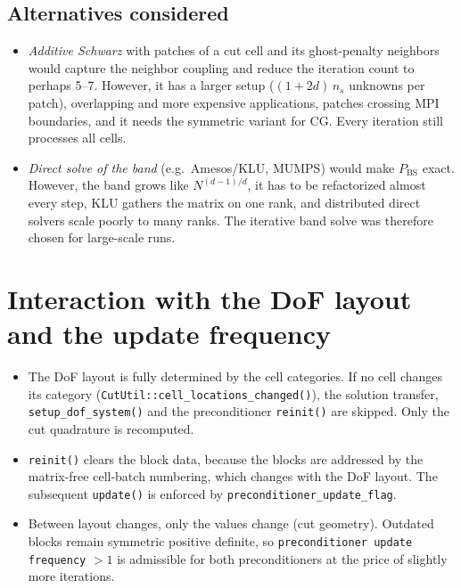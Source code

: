 \documentclass[11pt,a4paper]{article}
\newcommand{\PBS}{P_{\mathrm{BS}}}
\newcommand{\code}[1]{\nolinkurl{#1}}
\newcommand{\param}[1]{\texttt{#1}}
\begin{document}
\subsection{Alternatives considered}
\begin{itemize}[leftmargin=*]
  \item \emph{Additive Schwarz} with patches of a cut cell and its ghost-penalty neighbors would
        capture the neighbor coupling and reduce the iteration count to perhaps 5--7. However, it
        has a larger setup ($(1+2d)\,n_s$ unknowns per patch), overlapping and more expensive
        applications, patches crossing MPI boundaries, and it needs the symmetric variant for CG.
        Every iteration still processes all cells.
  \item \emph{Direct solve of the band} (e.g.\ Amesos/KLU, MUMPS) would make $\PBS$ exact. However,
        the band grows like $N^{(d-1)/d}$, it has to be refactorized almost every step, KLU gathers
        the matrix on one rank, and distributed direct solvers scale poorly to many ranks. The
        iterative band solve was therefore chosen for large-scale runs.
\end{itemize}

\section{Interaction with the DoF layout and the update frequency}
\label{sec:layout}

\begin{itemize}[leftmargin=*]
  \item The DoF layout is fully determined by the cell categories. If no cell changes its category
        (\code{CutUtil::cell_locations_changed()}), the solution transfer, \code{setup_dof_system()}
        and the preconditioner \code{reinit()} are skipped. Only the cut quadrature is recomputed.
  \item \code{reinit()} clears the block data, because the blocks are addressed by the matrix-free
        cell-batch numbering, which changes with the DoF layout. The subsequent \code{update()} is
        enforced by \code{preconditioner_update_flag}.
  \item Between layout changes, only the values change (cut geometry). Outdated blocks remain
        symmetric positive definite, so \param{preconditioner update frequency} $>1$ is admissible
        for both preconditioners at the price of slightly more iterations.
\end{itemize}
\end{document}
